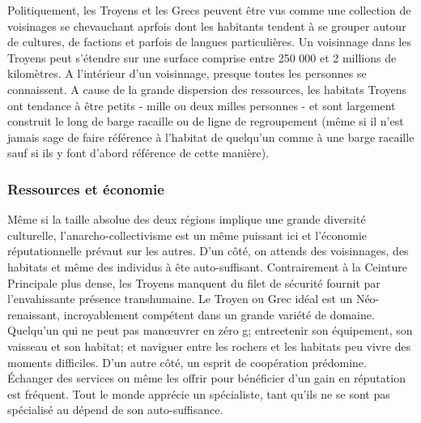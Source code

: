                                                                Politiquement, les Troyens et les Grecs peuvent être vus comme une collection de voisinages se chevauchant aprfois dont les habitants tendent à se grouper autour de cultures, de factions et parfois de langues particulières. Un voisinnage dans les Troyens peut s'étendre sur une surface comprise entre 250 000 et 2 millions de kilomètres. A l'intérieur d'un voisinnage, presque toutes les personnes se connaissent. A cause de la grande dispersion des ressources, les habitats Troyens ont tendance à être petits - mille ou deux milles personnes - et sont largement construit le long de barge racaille ou de ligne de regroupement (même si il n'est jamais sage de faire référence à l'habitat de quelqu'un comme à une barge racaille sauf si ils y font d'abord référence de cette manière). 

                                                               \subsubsection{Ressources et économie} \label{sec:trojans-resources-economics} 

                                                               Même si la taille absolue des deux régions implique une grande diversité culturelle, l'anarcho-collectivisme est un même puissant ici et l'économie réputationnelle prévaut sur les autres. D'un côté, on attends des voisinnages, des habitats et même des individus à ête auto-suffisant. Contrairement à la Ceinture Principale plus dense, les Troyens manquent du filet de sécurité fournit par l'envahissante présence transhumaine. Le Troyen ou Grec idéal est un Néo-renaissant, incroyablement compétent dans un grande variété de domaine. Quelqu'un qui ne peut pas manœuvrer en zéro g; entreetenir son équipement, son vaisseau et son habitat; et naviguer entre les rochers et les habitats peu vivre des moments difficiles. D'un autre côté, un esprit de coopération prédomine. Échanger des services ou même les offrir pour bénéficier d'un gain en réputation est fréquent. Tout le monde apprécie un spécialiste, tant qu'ils ne se sont pas spécialisé au dépend de son auto-suffisance. 

